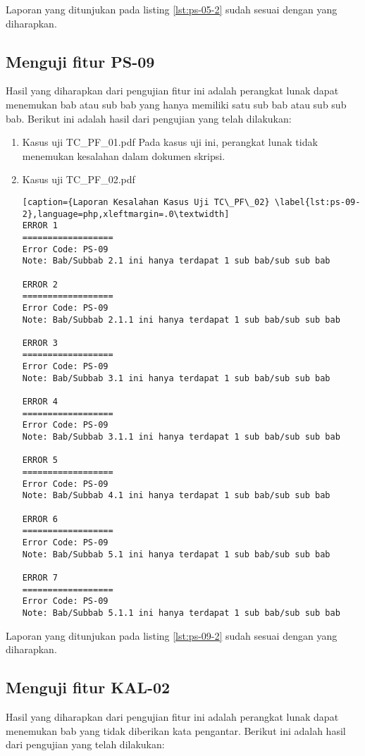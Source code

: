 Laporan yang ditunjukan pada listing \ref{lst:ps-05-2} sudah sesuai dengan yang diharapkan.

\subsection{Menguji fitur PS-09}
Hasil yang diharapkan dari pengujian fitur ini adalah perangkat lunak dapat menemukan bab atau sub bab yang hanya memiliki satu sub bab atau sub sub bab. Berikut ini adalah hasil dari pengujian yang telah dilakukan:

\begin{enumerate}
	\item Kasus uji TC\_PF\_01.pdf
	Pada kasus uji ini, perangkat lunak tidak menemukan kesalahan dalam dokumen skripsi.
	
	\item Kasus uji TC\_PF\_02.pdf
	
\begin{lstlisting}[caption={Laporan Kesalahan Kasus Uji TC\_PF\_02}	\label{lst:ps-09-2},language=php,xleftmargin=.0\textwidth]
ERROR 1
==================
Error Code: PS-09
Note: Bab/Subbab 2.1 ini hanya terdapat 1 sub bab/sub sub bab

ERROR 2
==================
Error Code: PS-09
Note: Bab/Subbab 2.1.1 ini hanya terdapat 1 sub bab/sub sub bab

ERROR 3
==================
Error Code: PS-09
Note: Bab/Subbab 3.1 ini hanya terdapat 1 sub bab/sub sub bab

ERROR 4
==================
Error Code: PS-09
Note: Bab/Subbab 3.1.1 ini hanya terdapat 1 sub bab/sub sub bab

ERROR 5
==================
Error Code: PS-09
Note: Bab/Subbab 4.1 ini hanya terdapat 1 sub bab/sub sub bab

ERROR 6
==================
Error Code: PS-09
Note: Bab/Subbab 5.1 ini hanya terdapat 1 sub bab/sub sub bab

ERROR 7
==================
Error Code: PS-09
Note: Bab/Subbab 5.1.1 ini hanya terdapat 1 sub bab/sub sub bab
\end{lstlisting}
\end{enumerate}

Laporan yang ditunjukan pada listing \ref{lst:ps-09-2} sudah sesuai dengan yang diharapkan.

\subsection{Menguji fitur KAL-02}
Hasil yang diharapkan dari pengujian fitur ini adalah perangkat lunak dapat menemukan bab yang tidak diberikan kata pengantar. Berikut ini adalah hasil dari pengujian yang telah dilakukan:


